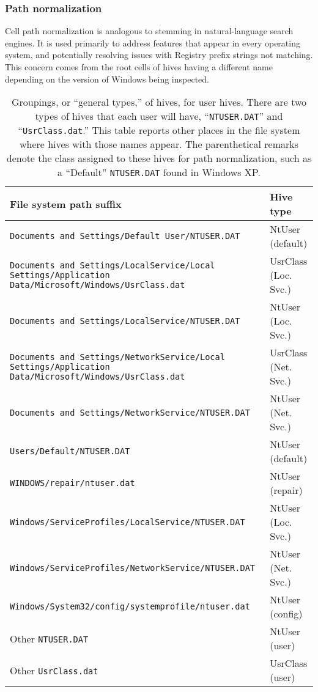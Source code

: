 \documentclass[11pt]{ucthesis}
\theoremstyle{plain}
\theoremstyle{definition}
\begin{document}
\subsubsection{Path normalization}\label{sec:pathnormalization}

Cell path normalization is analogous to stemming in natural-language search engines.  It is used primarily to address features that appear in every operating system, and potentially resolving issues with Registry prefix strings not matching.  This concern comes from the root cells of hives having a different name depending on the version of Windows being inspected.

\begin{table}[htp]
\caption{Groupings, or ``general types,'' of hives, for user hives.  There are two types of hives that each user will have, ``\texttt{NTUSER.DAT}'' and ``\texttt{UsrClass.dat}.''  This table reports other places in the file system where hives with those names appear.  The parenthetical remarks denote the class assigned to these hives for path normalization, such as a ``Default'' \texttt{NTUSER.DAT} found in Windows XP.}
\begin{center}
\begin{small}
\begin{tabular}{p{}p{}}
\toprule
File system path suffix & Hive type \\
\midrule
\texttt{Documents and Settings/Default User/NTUSER.DAT} & NtUser (default) \\
\texttt{Documents and Settings/LocalService/Local Settings/Application Data/Microsoft/Windows/UsrClass.dat} & UsrClass (Loc. Svc.) \\
\texttt{Documents and Settings/LocalService/NTUSER.DAT} & NtUser (Loc. Svc.) \\
\texttt{Documents and Settings/NetworkService/Local Settings/Application Data/Microsoft/Windows/UsrClass.dat} & UsrClass (Net. Svc.) \\
\texttt{Documents and Settings/NetworkService/NTUSER.DAT} & NtUser (Net. Svc.) \\
\texttt{Users/Default/NTUSER.DAT} & NtUser (default) \\
\texttt{WINDOWS/repair/ntuser.dat} & NtUser (repair) \\
\texttt{Windows/ServiceProfiles/LocalService/NTUSER.DAT} & NtUser (Loc. Svc.) \\
\texttt{Windows/ServiceProfiles/NetworkService/NTUSER.DAT} & NtUser (Net. Svc.) \\
\texttt{Windows/System32/config/systemprofile/ntuser.dat} & NtUser (config) \\
Other \texttt{NTUSER.DAT} & NtUser (user) \\
Other \texttt{UsrClass.dat} & UsrClass (user) \\
\bottomrule
\end{tabular}
\end{small}
\end{center}
\label{tbl:hivegroupings:user}
\end{table}%
\end{document}
